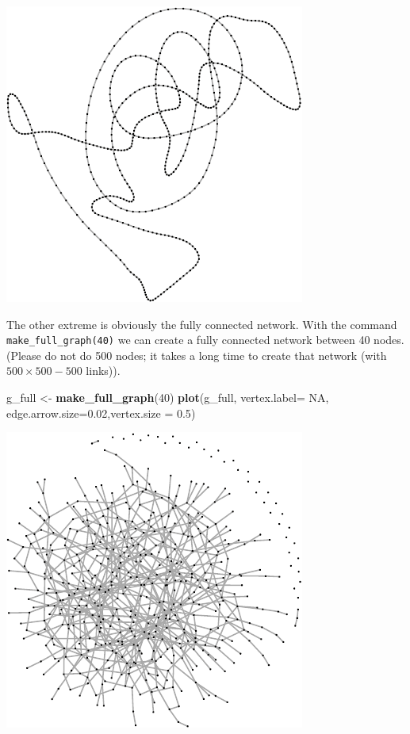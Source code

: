 \documentclass[]{article}
\newenvironment{Shaded}{\begin{snugshade}}{\end{snugshade}}
\newcommand{\KeywordTok}[1]{\textcolor[rgb]{0.13,0.29,0.53}{\textbf{{#1}}}}
\newcommand{\DataTypeTok}[1]{\textcolor[rgb]{0.13,0.29,0.53}{{#1}}}
\newcommand{\DecValTok}[1]{\textcolor[rgb]{0.00,0.00,0.81}{{#1}}}
\newcommand{\FloatTok}[1]{\textcolor[rgb]{0.00,0.00,0.81}{{#1}}}
\newcommand{\StringTok}[1]{\textcolor[rgb]{0.31,0.60,0.02}{{#1}}}
\newcommand{\OtherTok}[1]{\textcolor[rgb]{0.56,0.35,0.01}{{#1}}}
\newcommand{\NormalTok}[1]{{#1}}
\begin{document}
\includegraphics{ResearchTools_files/figure-latex/unnamed-chunk-46-1.pdf}

The other extreme is obviously the fully connected network. With the
command \texttt{make\_full\_graph(40)} we can create a fully connected
network between 40 nodes. (Please do not do 500 nodes; it takes a long
time to create that network (with \(500 \times 500 - 500\) links)).

\begin{Shaded}
\begin{Highlighting}[]
\NormalTok{g_full <-}\StringTok{ }\KeywordTok{make_full_graph}\NormalTok{(}\DecValTok{40}\NormalTok{)}
\KeywordTok{plot}\NormalTok{(g_full, }\DataTypeTok{vertex.label=} \OtherTok{NA}\NormalTok{, }\DataTypeTok{edge.arrow.size=}\FloatTok{0.02}\NormalTok{,}\DataTypeTok{vertex.size =} \FloatTok{0.5}\NormalTok{)}
\end{Highlighting}
\end{Shaded}

\includegraphics{ResearchTools_files/figure-latex/unnamed-chunk-47-1.pdf}
\end{document}
